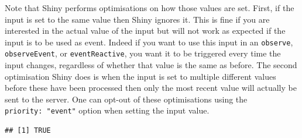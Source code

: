 \documentclass[
]{krantz}
\makeatletter
\newenvironment{Shaded}{\begin{snugshade}}{\end{snugshade}}
\newcommand{\CommentTok}[1]{\textcolor[rgb]{0.37,0.37,0.37}{\textit{#1}}}
\newcommand{\ControlFlowTok}[1]{\textcolor[rgb]{0.27,0.27,0.27}{\textbf{#1}}}
\newcommand{\DataTypeTok}[1]{\textcolor[rgb]{0.27,0.27,0.27}{#1}}
\newcommand{\KeywordTok}[1]{\textcolor[rgb]{0.27,0.27,0.27}{\textbf{#1}}}
\newcommand{\NormalTok}[1]{#1}
\newcommand{\OperatorTok}[1]{\textcolor[rgb]{0.43,0.43,0.43}{\textbf{#1}}}
\newcommand{\StringTok}[1]{\textcolor[rgb]{0.5,0.5,0.5}{#1}}
\newenvironment{kframe}{%
\medskip{}
\setlength{\fboxsep}{.8em}
 \def\at@end@of@kframe{}%
 \ifinner\ifhmode%
  \def\at@end@of@kframe{\end{minipage}}%
  \begin{minipage}{\columnwidth}%
 \fi\fi%
 \def\FrameCommand##1{\hskip\@totalleftmargin \hskip-\fboxsep
 \colorbox{shadecolor}{##1}\hskip-\fboxsep
     \hskip-\linewidth \hskip-\@totalleftmargin \hskip\columnwidth}%
 \MakeFramed {\advance\hsize-\width
   \@totalleftmargin\z@ \linewidth\hsize
   \@setminipage}}%
 {\par\unskip\endMakeFramed%
 \at@end@of@kframe}
\renewenvironment{Shaded}{\begin{kframe}}{\end{kframe}}
\makeatother
\begin{document}
Note that Shiny performs optimisations on how those values are set. First, if the input is set to the same value then Shiny ignores it. This is fine if you are interested in the actual value of the input but will not work as expected if the input is to be used as event. Indeed if you want to use this input in an \texttt{observe}, \texttt{observeEvent}, or \texttt{eventReactive}, you want it to be triggered every time the input changes, regardless of whether that value is the same as before. The second optimisation Shiny does is when the input is set to multiple different values before these have been processed then only the most recent value will actually be sent to the server. One can opt-out of these optimisations using the \texttt{priority:\ "event"} option when setting the input value.

\begin{Shaded}
\end{Shaded}

\begin{verbatim}
## [1] TRUE
\end{verbatim}
\end{document}
